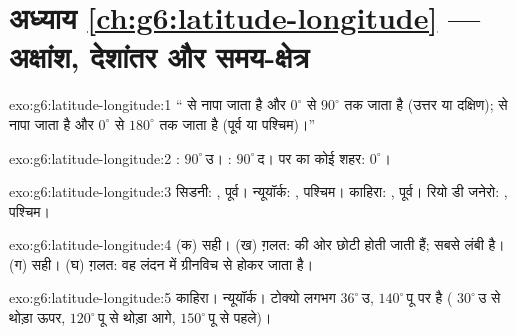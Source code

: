 \section*{अध्याय \ref{ch:g6:latitude-longitude} --- अक्षांश, देशांतर और समय-क्षेत्र}

\begin{solution}{exo:g6:latitude-longitude:1}
``  से नापा जाता है और $0^\circ$ से
$90^\circ$ तक जाता है (उत्तर या दक्षिण);   से नापा जाता है
और $0^\circ$ से $180^\circ$ तक जाता है (पूर्व या पश्चिम)।''
\end{solution}

\begin{solution}{exo:g6:latitude-longitude:2}
: $90^\circ$\,उ। : $90^\circ$\,द।  पर का कोई
शहर: $0^\circ$।
\end{solution}

\begin{solution}{exo:g6:latitude-longitude:3}
सिडनी: , पूर्व। न्यूयॉर्क: , पश्चिम।
काहिरा: , पूर्व। रियो डी जनेरो: ,
पश्चिम।
\end{solution}

\begin{solution}{exo:g6:latitude-longitude:4}
(क) सही। (ख) ग़लत:   की ओर छोटी होती जाती हैं; सबसे
लंबी  है। (ग) सही। (घ) ग़लत: वह लंदन में ग्रीनविच से
होकर जाता है।
\end{solution}

\begin{solution}{exo:g6:latitude-longitude:5}
काहिरा। न्यूयॉर्क। टोक्यो लगभग $36^\circ$\,उ, $140^\circ$\,पू पर है ( $30^\circ$\,उ से थोड़ा ऊपर, 
$120^\circ$\,पू से थोड़ा आगे, $150^\circ$\,पू से पहले)।
\end{solution}

